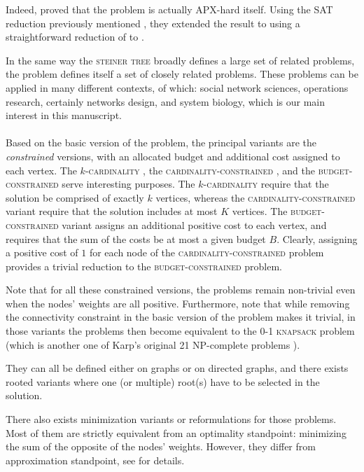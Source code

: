 	Indeed, \textcite{alvarez2013maximum} proved that the \mwcs{} problem is actually APX-hard itself.
	Using the SAT reduction previously mentioned \parencite{feigenbaum2000sharing}, they extended the result to \mwcs{} using a straightforward reduction of \pcst{} to \mwcs{}.

	In the same way the \textsc{steiner tree} broadly defines a large set of related problems, the \mwcs{} problem defines itself a set of closely related problems.
	These problems can be applied in many different contexts, of which: social network sciences, operations research, certainly networks design, and system biology, which is our main interest in this manuscript.

	\paragraph{}
	Based on the basic version of the \mwcs{} problem, the principal variants are the \emph{constrained} versions, with an allocated budget and additional cost assigned to each vertex.
	The \textsc{$k$-cardinality \mwcs{}}, the \textsc{cardinality-constrained \mwcs{}}, and the \textsc{budget-constrained \mwcs{}} serve interesting purposes.
	The \textsc{$k$-cardinality \mwcs{}} require that the solution be comprised of exactly $k$ vertices, whereas the \textsc{cardinality-constrained \mwcs{}} variant require that the solution includes at most $K$ vertices.
	The \textsc{budget-constrained \mwcs{}} variant assigns an additional positive cost to each vertex, and requires that the sum of the costs be at most a given budget $B$.
	Clearly, assigning a positive cost of $1$ for each node of the \textsc{cardinality-constrained \mwcs{}} problem provides a trivial reduction to the \textsc{budget-constrained \mwcs{}} problem.

	Note that for all these constrained versions, the problems remain non-trivial even when the nodes' weights are all positive.
	Furthermore, note that while removing the connectivity constraint in the basic version of the problem makes it trivial, in those variants the problems then become equivalent to the \textsc{0-1 knapsack} problem (which is another one of Karp's original 21 NP-complete problems \parencite{karp1972reducibility}).

	They can all be defined either on graphs or on directed graphs, and there exists rooted variants where one (or multiple) root(s) have to be selected in the solution.

	There also exists minimization variants or reformulations for those problems. Most of them are strictly equivalent from an optimality standpoint: minimizing the sum of the opposite of the nodes' weights.
	However, they differ from approximation standpoint, see \parencites{feigenbaum2000sharing}{johnson2000prize} for details.

